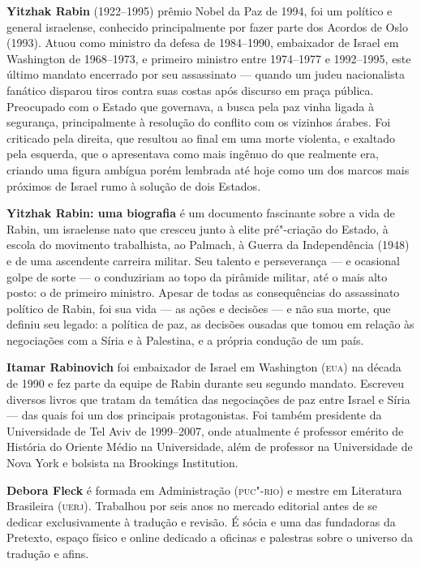 \textbf{Yitzhak Rabin} (1922--1995) prêmio Nobel da Paz de 1994, foi um político e general israelense, conhecido principalmente por fazer parte dos Acordos de Oslo (1993). Atuou como ministro da defesa de 1984--1990, embaixador de Israel em Washington de 1968--1973, e primeiro ministro entre 1974--1977 e 1992--1995, este último mandato encerrado por seu assassinato --- quando um judeu nacionalista fanático disparou tiros contra suas costas após discurso em praça pública. Preocupado com o Estado que governava, a busca pela paz vinha ligada à segurança, principalmente à resolução do conflito com os vizinhos árabes. Foi criticado pela direita, que resultou ao final em uma morte violenta, e exaltado pela esquerda, que o apresentava como mais ingênuo do que realmente era, criando uma figura ambígua porém lembrada até hoje como um dos marcos mais próximos de Israel rumo à solução de dois Estados.

\textbf{Yitzhak Rabin: uma biografia} é um documento fascinante sobre a vida de Rabin, um israelense nato que cresceu junto à elite pré"-criação do Estado, à escola do movimento trabalhista, ao Palmach, à Guerra da Independência (1948) e de uma ascendente carreira militar. Seu talento e perseverança --- e ocasional golpe de sorte --- o conduziriam ao topo da pirâmide militar, até o mais alto posto: o de primeiro ministro. Apesar de todas as consequências do assassinato político de Rabin, foi sua vida --- as ações e decisões --- e não sua morte, que definiu seu legado: a política de paz, as decisões ousadas que tomou em relação às negociações com a Síria e à Palestina, e a própria condução de um país.

\textbf{Itamar Rabinovich} foi embaixador de Israel em Washington (\textsc{eua}) na década de 1990 e fez parte da equipe de Rabin durante seu segundo mandato. Escreveu diversos livros que tratam da temática das negociações de paz entre Israel e Síria --- das quais foi um dos principais protagonistas. Foi também presidente da Universidade de Tel Aviv de 1999--2007, onde atualmente é professor emérito de História do Oriente Médio na Universidade, além de professor na Universidade de Nova York e bolsista na Brookings Institution.

\textbf{Debora Fleck} é formada em Administração (\textsc{puc"-rio}) e mestre em Literatura Brasileira (\textsc{uerj}). Trabalhou por seis anos no mercado editorial antes de se dedicar exclusivamente à tradução e revisão. É sócia e uma das fundadoras da Pretexto, espaço físico e online dedicado a oficinas e palestras sobre o universo da tradução e afins.

